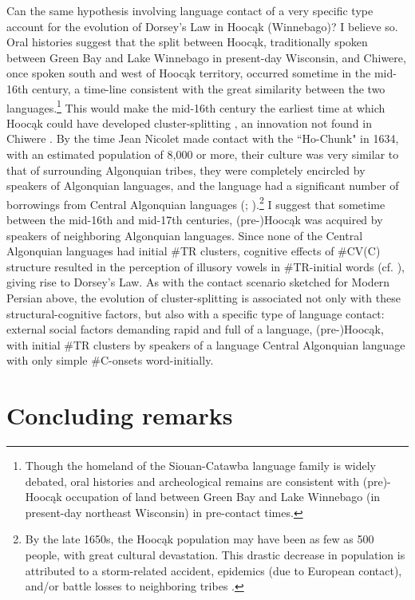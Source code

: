 \documentclass[output=paper,
modfonts
]{LSP/langsci}
\begin{document}
Can the same hypothesis involving language contact of a very specific
type account for the evolution of Dorsey's Law in Hoocąk (Winnebago)? I
believe so. Oral histories suggest that the split between Hoocąk,
traditionally spoken between Green Bay and Lake Winnebago in present-day
Wisconsin, and Chiwere, once spoken south and west of Hoocąk territory,
occurred sometime in the mid-16th century, a time-line consistent with
the great similarity between the two languages.\footnote{Though the
  homeland of the Siouan-Catawba language family is widely debated, oral
  histories and archeological remains are consistent with (pre)-Hoocąk
  occupation of land between Green Bay and Lake Winnebago (in
  present-day northeast Wisconsin) in pre-contact times.} This would
make the mid-16th century the earliest time at which Hoocąk could have
developed cluster-splitting , an innovation not found in
Chiwere . By the time Jean Nicolet made contact with the ``Ho-Chunk"
in 1634, with an estimated population of 8,000 or more, their culture
was very similar to that of surrounding Algonquian tribes, they were
completely encircled by speakers of Algonquian languages, and the
language had a significant number of borrowings from Central Algonquian
languages (\citealt{radin1990a}; \citealt[17]{pfister2009a}).\footnote{By the late 1650s, the
  Hoocąk population may have been as few as 500 people, with great
  cultural devastation. This drastic decrease in population is
  attributed to a storm-related accident, epidemics (due to European
  contact), and/or battle losses to neighboring tribes \citep{edmunds1978a, radin1990a}.} I suggest that sometime between the mid-16th and
mid-17th centuries, (pre-)Hoocąk was acquired by speakers of neighboring
Algonquian languages. Since none of the Central Algonquian languages had
initial \#TR clusters, cognitive effects of \#CV(C)  structure
resulted in the perception of illusory vowels in \#TR-initial words (cf.
\citealt{dupoux1999a}), giving rise to Dorsey's Law. As with the contact
scenario sketched for Modern Persian above, the evolution of
cluster-splitting  is associated not only with these
structural-cognitive factors, but also with a specific type of language
contact: external social factors demanding rapid and full  of
a language, (pre-)Hoocąk, with initial \#TR clusters by speakers of a
language Central Algonquian language with only simple \#C-onsets
word-initially.

\section{Concluding remarks}
\end{document}
